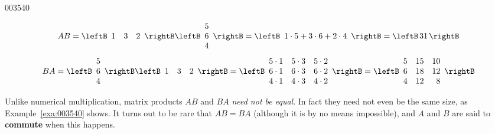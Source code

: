 \begin{example}{}{003540}
\begin{solution}
\begin{equation*}
AB = \leftB \begin{array}{rrr}
1 & 3 & 2
\end{array} \rightB \leftB \begin{array}{r}
5 \\
6 \\
4
\end{array} \rightB = \leftB \begin{array}{c} 1 \cdot 5 + 3 \cdot 6 + 2 \cdot 4 \end{array} \rightB = \arraycolsep=1.5pt \leftB \begin{array}{c} 31 \end{array}\rightB
\end{equation*}
\begin{equation*}
BA = \leftB \begin{array}{r}
5 \\
6 \\
4
\end{array} \rightB \leftB \begin{array}{rrr}
1 & 3 & 2
\end{array} \rightB = \leftB \begin{array}{rrr}
5 \cdot 1 & 5 \cdot 3 & 5 \cdot 2 \\
6 \cdot 1 & 6 \cdot 3 & 6 \cdot 2 \\
4 \cdot 1 & 4 \cdot 3 & 4 \cdot 2
\end{array} \rightB = \leftB \begin{array}{rrr}
5 & 15 & 10 \\
6 & 18 & 12 \\
4 & 12 & 8
\end{array} \rightB
\end{equation*}
\end{solution}
\end{example}

Unlike numerical multiplication, matrix products $AB$ and $BA$ \textit{need not be equal}. In fact they need not even be the same size, as Example~\ref{exa:003540} shows. It turns out to be rare that $AB = BA$ (although it is by no means impossible), and $A$ and $B$ are said to \textbf{commute} when this happens.


